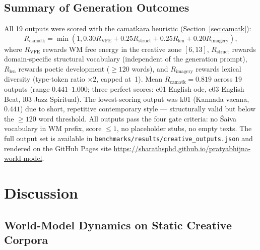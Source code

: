 \documentclass[journal,onecolumn,11pt]{IEEEtran}
\begin{document}
\subsection{Summary of Generation Outcomes}\label{sec:gen-summary}

All 19 outputs were scored with the camatkāra heuristic (Section~\ref{sec:camatk}):
%
\begin{equation}
  R_{\text{camatk}} = \min\!\left(1, 0.30 R_{\text{VFE}} + 0.25 R_{\text{struct}}
  + 0.25 R_{\text{len}} + 0.20 R_{\text{imagery}}\right),
\end{equation}
%
where $R_{\text{VFE}}$ rewards WM free energy in the creative zone $[6, 13]$,
$R_{\text{struct}}$ rewards domain-specific structural vocabulary (independent
of the generation prompt), $R_{\text{len}}$ rewards poetic development
($\geq 120$ words), and $R_{\text{imagery}}$ rewards lexical diversity
(type-token ratio $\times 2$, capped at~1).
Mean $R_{\text{camatk}} = 0.819$ across 19 outputs (range $0.441$–$1.000$;
three perfect scores: e01 English ode, e03 English Beat, l03 Jazz Spiritual).
The lowest-scoring output was k01 (Kannada vacana, $0.441$) due to
short, repetitive contemporary style — structurally valid but below the
$\geq 120$ word threshold.
All outputs pass the four gate criteria: no Śaiva vocabulary in WM prefix,
score $\leq 1$, no placeholder stubs, no empty texts.
The full output set is available in \texttt{benchmarks/results/creative\_outputs.json}
and rendered on the GitHub Pages site
\url{https://sharathsphd.github.io/pratyabhijna-world-model}.

\section{Discussion}\label{sec:discussion}

\subsection{World-Model Dynamics on Static Creative Corpora}\label{sec:wm-dynamics}
\end{document}
